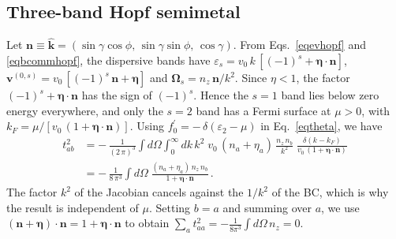 \documentclass[aps,prb,onecolumn,nofootinbib,citeautoscript,10pt]{revtex4-2}
\newcommand{\bs}[1]{\boldsymbol{#1}}
\def \nn{\nonumber \\}
\begin{document}
\subsection{Three-band Hopf semimetal}

Let $\bs n\equiv\hat{\bs k}=(\sin\gamma\cos\phi,\,\sin\gamma\sin\phi,\,\cos\gamma)$. From Eqs.~\eqref{eqevhopf} and \eqref{eqbcommhopf}, the dispersive bands have $\varepsilon_s=v_0\,k\,[(-1)^s+\bs\eta\cdot\bs n]$, $\bs v^{(0,s)}=v_0\,[(-1)^s\,\bs n+\bs\eta]$ and $\bs\Omega_s=n_z\,\bs n/k^2$. Since $\eta<1$, the factor $(-1)^s+\bs\eta\cdot\bs n$ has the sign of $(-1)^s$. Hence the $s=1$ band lies below zero energy everywhere, and only the $s=2$ band has a Fermi surface at $\mu>0$, with $k_F=\mu/[v_0\,(1+\bs\eta\cdot\bs n)]$. Using $f_0^\prime=-\,\delta(\varepsilon_2-\mu)$ in Eq.~\eqref{eqtheta}, we have
\begin{align}
t^2_{ab} & = -\,\frac{1}{(2\,\pi)^3} \int d\Omega \int_0^\infty dk\,k^2\; v_0\,(n_a+\eta_a)\,\frac{n_z\,n_b}{k^2}\; \frac{\delta (k-k_F)}{v_0\,(1+\bs\eta\cdot\bs n)}\nn
& = -\,\frac{1}{8\,\pi^3} \int d\Omega\; \frac{(n_a+\eta_a)\,n_z\,n_b}{1+\bs\eta\cdot\bs n}\,.
\end{align}
The factor $k^2$ of the Jacobian cancels against the $1/k^2$ of the BC, which is why the result is independent of $\mu$. Setting $b=a$ and summing over $a$, we use $(\bs n+\bs\eta)\cdot\bs n=1+\bs\eta\cdot\bs n$ to obtain $\sum_a t^2_{aa}=-\frac{1}{8\pi^3}\int d\Omega\,n_z=0$.
\end{document}
